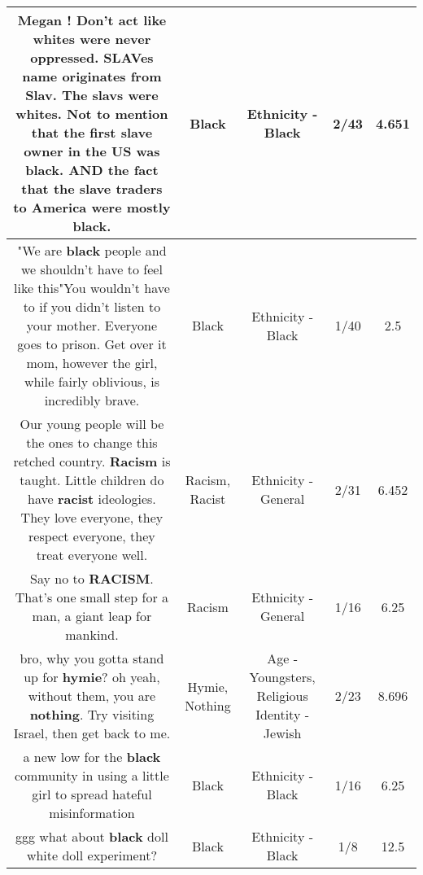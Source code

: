 \documentclass[11pt]{article}
\newlength\mylength
\begin{document}
\begin{center}
\begin{longtable}{|C{.65\mylength}|C{.30\mylength}|C{.12\mylength}|C{.12\mylength}|C{.12\mylength}|}
  \small Megan ! Don't act like whites were never oppressed. SLAVes name originates from Slav. The slavs were whites. Not to mention that the first slave owner in the US was \textbf{black}. AND the fact that the slave traders to America were mostly \textbf{black}.\normalsize   & Black & Ethnicity - Black & 2/43 & 4.651 \\  \hline
  \small "We are \textbf{black} people and we shouldn't have to feel like this"You wouldn't have to if you didn't listen to your mother. Everyone goes to prison. Get over it mom, however the girl, while fairly oblivious, is incredibly brave.\normalsize   & Black & Ethnicity - Black & 1/40 & 2.5 \\  \hline
  \small Our young people will be the ones to change this retched country. \textbf{Racism} is taught. Little children do have \textbf{racist} ideologies. They love everyone, they respect everyone, they treat everyone well.\normalsize   & Racism, Racist & Ethnicity - General & 2/31 & 6.452 \\  \hline
  \small Say no to \textbf{RACISM}. That's one small step for a man, a giant leap for mankind.\normalsize   & Racism & Ethnicity - General & 1/16 & 6.25 \\  \hline
  \small bro, why you gotta stand up for \textbf{hymie}? oh yeah, without them, you are \textbf{nothing}. Try visiting Israel, then get back to me.\normalsize   & Hymie, Nothing & Age - Youngsters, Religious Identity - Jewish & 2/23 & 8.696 \\  \hline
  \small a new low for the \textbf{black} community in using a little girl to spread hateful misinformation\normalsize   & Black & Ethnicity - Black & 1/16 & 6.25 \\  \hline
  \small ggg what about \textbf{black} doll white doll experiment?\normalsize   & Black & Ethnicity - Black & 1/8 & 12.5 \\  \hline

\end{longtable}
\end{center}
\end{document}
